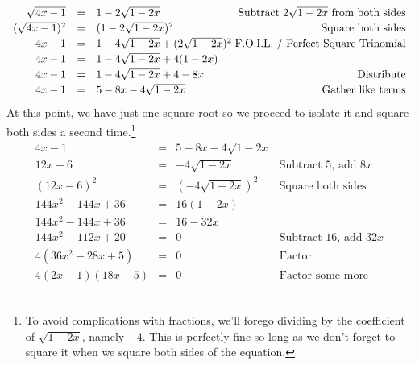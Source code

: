\begin{ex}
\begin{enumerate}
\[\begin{array}{rclr}
\sqrt{4x-1} & = & 1 - 2\sqrt{1-2x} & \hspace*{-.1in} \text{Subtract $2\sqrt{1 - 2x}$ from both sides} \\[2pt]

(\sqrt{4x-1})^2 & = & (1 - 2\sqrt{1-2x})^2 & \text{Square both sides} \\[2pt]

4x - 1 & = & 1 - 4\sqrt{1-2x} + (2\sqrt{1-2x})^2 & \hspace*{-.1in} \text{F.O.I.L. / Perfect Square Trinomial} \\[2pt]

4x - 1 & = & 1 - 4\sqrt{1-2x} + 4(1-2x) & \\[2pt]

4x - 1 & = & 1 - 4\sqrt{1-2x} + 4 - 8x & \text{Distribute} \\ [2pt]

4x - 1 & = & 5 - 8x - 4\sqrt{1-2x} & \text{Gather like terms} \\ \end{array} \] At this point, we have just one square root so we proceed to isolate it and square both sides a second time.\footnote{To avoid complications with fractions, we'll forego dividing by the coefficient of $\sqrt{1-2x}$, namely $-4$. This is perfectly fine so long as we don't forget to square it when we square both sides of the equation.} \[ \begin{array}{rclr}

4x - 1 & = & 5 - 8x - 4\sqrt{1-2x} &  \\ [2pt]

12x - 6 & = & -4\sqrt{1-2x} & \text{Subtract $5$, add $8x$}\\ [2pt]

(12x-6)^2 & = & (-4\sqrt{1-2x})^2 & \text{Square both sides} \\[2pt]

144x^2 - 144x + 36 & = & 16(1-2x) & \\ [2pt]

144x^2 -  144x + 36 & = & 16 - 32x & \\[2pt]

144x^2 - 112x + 20 & = & 0 & \text{Subtract $16$, add $32x$} \\[2pt]

4(36x^2 - 28x + 5) & = & 0 & \text{Factor} \\[2pt]

4(2x-1)(18x - 5) & = & 0 & \text{Factor some more} \\


\end{array}\]
\end{enumerate}
\end{ex}
